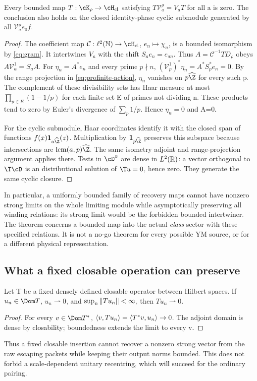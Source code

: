 \begin{theorem}\label{thm:bounded-occurrence}
Every bounded map $T:\cK_\rho\to\cH_{\rm cl}$ satisfying
$T\mathcal V_a^\rho=V_aT$ for all a is zero.
The conclusion also holds on the closed identity-phase cyclic
submodule generated by all $\mathcal V_a^\rho e_0f$.
\end{theorem}
\begin{proof}
The coefficient map $\mathcal C:\ell^2(\N)\to\cH_{\rm cl}$,
$e_n\mapsto\chi_n$, is a bounded isomorphism by
\eqref{eq:gram}. It intertwines $V_a$ with the shift
$S_ae_n=e_{an}$. Thus $A=\mathcal C^{-1}TD_\rho$ obeys
$A\mathcal V_a^1=S_aA$. For $\eta_n=A^*e_n$ and every prime
$p\nmid n$, $(\mathcal V_p^1)^*\eta_n=A^*S_p^*e_n=0$.
By the range projection in \eqref{eq:profinite-action},
$\eta_n$ vanishes on $p\widehat\Z$ for every such p.
The complement of these divisibility sets has Haar measure at
most $\prod_{p\in E}(1-1/p)$ for each finite set E of primes
not dividing n. These products tend to zero by Euler's
divergence of $\sum_p1/p$. Hence $\eta_n=0$ and A=0.

For the cyclic submodule, Haar coordinates identify it with the
closed span of functions $f(x)\mathbf1_{a\widehat\Z}(z)$.
Multiplication by $\mathbf1_{p\widehat\Z}$ preserves this subspace
because intersections are $\operatorname{lcm}(a,p)\widehat\Z$.
The same isometry adjoint and range-projection argument applies
there. Tests in $\cD^0$ are dense in $L^2(\mathbb R)$: a vector
orthogonal to $\T\cD$ is an \Ltwo{} distributional solution of
$\T u=0$, hence zero. They generate the same cyclic closure.
\end{proof}
In particular, a uniformly bounded family of recovery maps
cannot have nonzero strong limits on the whole limiting module
while asymptotically preserving all winding relations: its
strong limit would be the forbidden bounded intertwiner.
The theorem concerns a bounded map into the actual \emph{class}
sector with these specified relations. It is not a no-go theorem
for every possible YM source, or for a different physical
representation.

\subsection{What a fixed closable operation can preserve}
\begin{lemma}\label{lem:closable-weak}
Let T be a fixed densely defined closable operator between Hilbert
spaces. If $u_n\in\Dom T$, $u_n\rightharpoonup0$, and
$\sup_n\left\lVert Tu_n\right\rVert<\infty$, then $Tu_n\rightharpoonup0$.
\end{lemma}
\begin{proof}
For every $v\in\Dom T^*$,
$\left\langle v,Tu_n\right\rangle=\left\langle T^*v,u_n\right\rangle\to0$.
The adjoint domain is dense by closability; boundedness extends
the limit to every v.
\end{proof}
Thus a fixed closable insertion cannot recover a nonzero strong
vector from the raw escaping packets while keeping their output
norms bounded. This does not forbid a scale-dependent unitary
recentring, which will succeed for the ordinary \Ltwo{} pairing.

